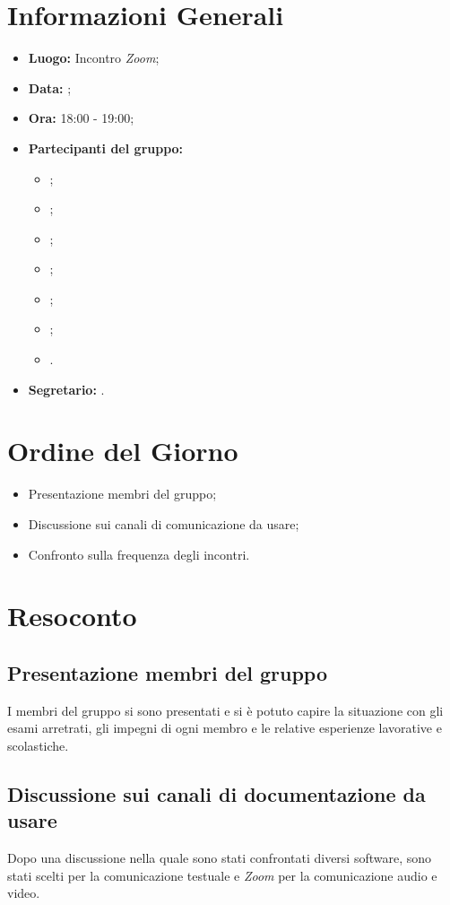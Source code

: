 \section{Informazioni Generali}
\begin{itemize}
\item \textbf{Luogo:} Incontro \textit{Zoom};
\item \textbf{Data:} \Data;
\item \textbf{Ora:} 18:00 - 19:00;
\item \textbf{Partecipanti del gruppo:}
	\begin{itemize}
		\item \BL{}; 
		\item \FF{};
		\item \MM{}; 
		\item \PC{};
		\item \TG{};
		\item \TL{};
		\item \VD{}.
	\end{itemize} 
\item \textbf{Segretario:} \PC{}.
\end{itemize}

\section{Ordine del Giorno}
\begin{itemize}
 \item Presentazione membri del gruppo;
 \item Discussione sui canali di comunicazione da usare;
 \item Confronto sulla frequenza degli incontri.
\end{itemize}

\section{Resoconto}
\subsection{Presentazione membri del gruppo}
I membri del gruppo si sono presentati e si è potuto capire la situazione con gli esami arretrati, gli impegni di ogni membro e le relative esperienze lavorative e scolastiche.

\subsection{Discussione sui canali di documentazione da usare}
Dopo una discussione nella quale sono stati confrontati diversi software, sono stati scelti  per la comunicazione testuale e \textit{Zoom} per la comunicazione audio e video.

